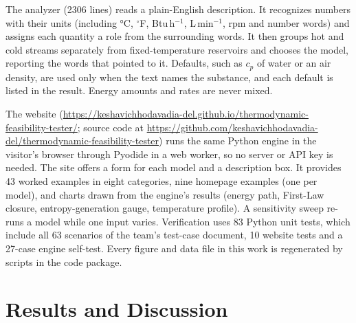 \documentclass[journal=iecred,manuscript=article,layout=twocolumn,email=false]{achemso}
\begin{document}
The analyzer (\num{2306} lines) reads a plain-English description. It recognizes numbers with their units (including
\si{\degreeCelsius}, $^\circ$F, Btu\,h$^{-1}$, L\,min$^{-1}$, rpm and number words) and assigns each
quantity a role from the surrounding words. It then groups hot and cold streams separately from fixed-temperature
reservoirs and chooses the model, reporting the words that pointed to it. Defaults, such as $c_p$ of water or an air
density, are used only when the text names the substance, and each default is listed in the result. Energy amounts and
rates are never mixed.

The website (\url{https://keshavichhodavadia-del.github.io/thermodynamic-feasibility-tester/}; source code at
\url{https://github.com/keshavichhodavadia-del/thermodynamic-feasibility-tester}) runs the same Python
engine in the visitor's browser through Pyodide in a web worker, so no server or API key is needed. The site offers a
form for each model and a description box. It provides 43 worked examples in eight categories, nine homepage examples
(one per model), and charts drawn from the engine's results (energy path, First-Law closure, entropy-generation gauge,
temperature profile). A sensitivity sweep re-runs a model while one input varies. Verification uses 83 Python unit
tests, which include all 63 scenarios of the team's test-case document, 10 website tests and a 27-case engine
self-test. Every figure and data file in this work is regenerated by scripts in the code package.

\section{Results and Discussion}
\end{document}
